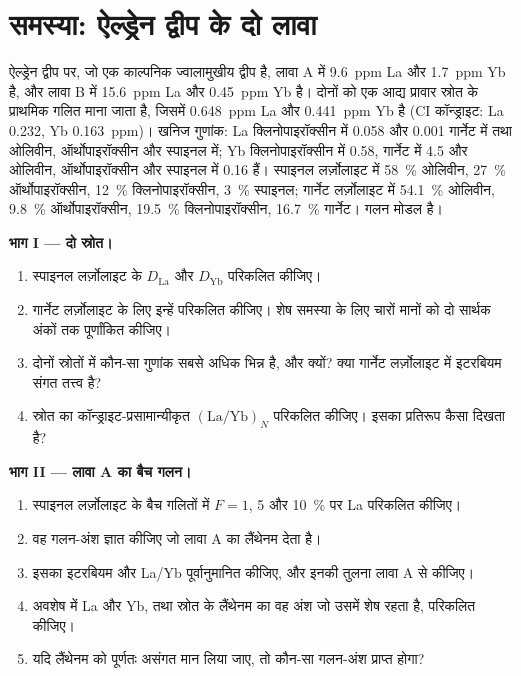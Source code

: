 \section{समस्या: ऐल्ड्रेन द्वीप के दो लावा}

\begin{problem}\label{pb:b3:trace-element-modelling:1}
ऐल्ड्रेन द्वीप पर, जो एक काल्पनिक ज्वालामुखीय द्वीप है, लावा A में \qty{9.6}{ppm} La
और \qty{1.7}{ppm} Yb है, और लावा B में \qty{15.6}{ppm} La और \qty{0.45}{ppm} Yb है।
दोनों को एक आद्य प्रावार स्रोत के प्राथमिक गलित माना जाता है, जिसमें
\qty{0.648}{ppm} La और \qty{0.441}{ppm} Yb है (CI कॉन्ड्राइट: La 0.232, Yb
\qty{0.163}{ppm})। खनिज गुणांक: La क्लिनोपाइरॉक्सीन में 0.058 और 0.001
गार्नेट में तथा ओलिवीन, ऑर्थोपाइरॉक्सीन और स्पाइनल में; Yb क्लिनोपाइरॉक्सीन में 0.58,
गार्नेट में 4.5 और ओलिवीन, ऑर्थोपाइरॉक्सीन और स्पाइनल में 0.16 हैं।
स्पाइनल लर्ज़ोलाइट में \qty{58}{\percent} ओलिवीन, \qty{27}{\percent} ऑर्थोपाइरॉक्सीन, \qty{12}{\percent}
क्लिनोपाइरॉक्सीन, \qty{3}{\percent} स्पाइनल; गार्नेट लर्ज़ोलाइट में \qty{54.1}{\percent} ओलिवीन, \qty{9.8}{\percent}
ऑर्थोपाइरॉक्सीन, \qty{19.5}{\percent} क्लिनोपाइरॉक्सीन, \qty{16.7}{\percent} गार्नेट। गलन मोडल है।

\medskip\noindent\textbf{भाग I --- दो स्रोत।}
\begin{enumerate}
\item स्पाइनल लर्ज़ोलाइट के $D_{\mathrm{La}}$ और $D_{\mathrm{Yb}}$ परिकलित कीजिए।
\item गार्नेट लर्ज़ोलाइट के लिए इन्हें परिकलित कीजिए।
शेष समस्या के लिए चारों मानों को दो सार्थक अंकों तक पूर्णांकित कीजिए।
\item दोनों स्रोतों में कौन-सा गुणांक सबसे अधिक भिन्न है, और क्यों?
क्या गार्नेट लर्ज़ोलाइट में इटरबियम संगत तत्त्व है?
\item स्रोत का कॉन्ड्राइट-प्रसामान्यीकृत $(\mathrm{La}/\mathrm{Yb})_N$ परिकलित कीजिए।
इसका प्रतिरूप कैसा दिखता है?
\end{enumerate}

\medskip\noindent\textbf{भाग II --- लावा A का बैच गलन।}
\begin{enumerate}[resume]
\item स्पाइनल लर्ज़ोलाइट के बैच गलितों में $F = 1$, 5 और
\qty{10}{\percent} पर La परिकलित कीजिए।
\item वह गलन-अंश ज्ञात कीजिए जो लावा A का लैंथेनम देता है।
\item इसका इटरबियम और La/Yb पूर्वानुमानित कीजिए, और इनकी तुलना लावा A से कीजिए।
\item अवशेष में La और Yb, तथा स्रोत के
लैंथेनम का वह अंश जो उसमें शेष रहता है, परिकलित कीजिए।
\item यदि लैंथेनम को पूर्णतः असंगत मान लिया जाए, तो कौन-सा गलन-अंश
प्राप्त होगा?
\end{enumerate}


\end{problem}
